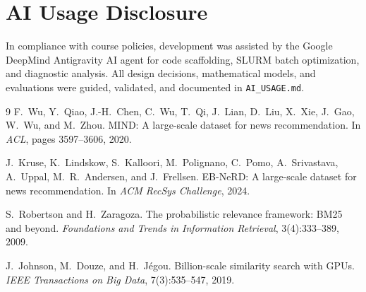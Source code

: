 \documentclass[10pt,twocolumn]{article}
\begin{document}
\section{AI Usage Disclosure}
In compliance with course policies, development was assisted by the Google DeepMind Antigravity AI agent for code scaffolding, SLURM batch optimization, and diagnostic analysis. All design decisions, mathematical models, and evaluations were guided, validated, and documented in \texttt{AI\_USAGE.md}.

\begin{thebibliography}{9}
\small
{}
F.~Wu, Y.~Qiao, J.-H.~Chen, C.~Wu, T.~Qi, J.~Lian, D.~Liu, X.~Xie, J.~Gao, W.~Wu, and M.~Zhou.
\newblock MIND: A large-scale dataset for news recommendation.
\newblock In \emph{ACL}, pages 3597--3606, 2020.

J.~Kruse, K.~Lindskow, S.~Kalloori, M.~Polignano, C.~Pomo, A.~Srivastava, A.~Uppal, M.~R.~Andersen, and J.~Frellsen.
\newblock EB-NeRD: A large-scale dataset for news recommendation.
\newblock In \emph{ACM RecSys Challenge}, 2024.

S.~Robertson and H.~Zaragoza.
\newblock The probabilistic relevance framework: BM25 and beyond.
\newblock \emph{Foundations and Trends in Information Retrieval}, 3(4):333--389, 2009.

J.~Johnson, M.~Douze, and H.~J{\'e}gou.
\newblock Billion-scale similarity search with GPUs.
\newblock \emph{IEEE Transactions on Big Data}, 7(3):535--547, 2019.
\end{thebibliography}
\end{document}

